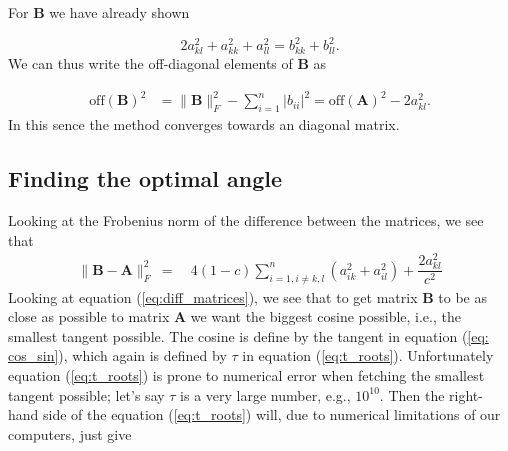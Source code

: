 \documentclass{emulateapj}
\begin{document}
        For \(\bm{B}\) we have already shown 
        
        \begin{equation*}
            2a^{2}_{kl} + a^{2}_{kk} +a^{2}_{ll} = b^{2}_{kk} + b^{2}_{ll}.
        \end{equation*}
        We can thus write the off-diagonal elements of \(\bm{B}\) as%
        
        \begin{align*}
            \text{off}(\bm{B})^{2} &= \parallel \bm{B} \parallel_{F}^{2} - \sum\limits_{i=1}^{n}|b_{ii}|^{2} = \text{off}(\bm{A})^{2} - 2a_{kl}^{2}.
        \end{align*}
        In this sence the method converges towards an diagonal matrix.
        
    \subsection{\textbf{Finding the optimal angle}}
        
        Looking at the Frobenius norm of the difference between the matrices, we see that \cite[chapter 8.5]{jacobis_method}
        \begin{align}\label{eq:diff_matrices}
            \parallel \bm{B} - \bm{A} \parallel^2_F\ =\ & 4(1 - c) \sum\limits_{i = 1, i \neq k,l}^n \left(a_{ik}^2 + a_{il}^2 \right) + \dfrac{2a_{kl}^2}{c^2}
        \end{align}
        Looking at equation (\ref{eq:diff_matrices}), we see that to get matrix \(\textbf{B}\) to be as close as possible to matrix \(\textbf{A}\) we want the biggest cosine possible, i.e., the smallest tangent possible. %
        The cosine is define by the tangent in equation (\ref{eq: cos_sin}), which again is defined by \(\tau\) in equation (\ref{eq:t_roots}). Unfortunately equation (\ref{eq:t_roots}) is prone to numerical error when fetching the smallest tangent possible;
        let's say \(\tau\) is a very large number, e.g., \(10^{10}\). Then the right-hand side of the equation (\ref{eq:t_roots}) will, due to numerical limitations of our computers, just give
        
\end{document}
